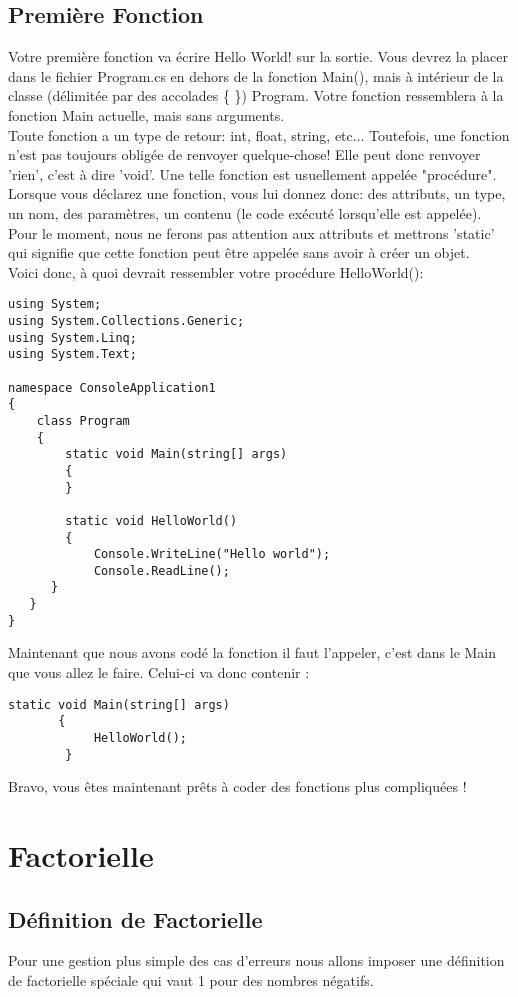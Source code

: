\documentclass[12pt,a4paper]{report}
\begin{document}
\subsection {Première Fonction}
Votre première fonction va écrire Hello World! sur la sortie. Vous devrez
la placer dans le fichier Program.cs en dehors de la fonction Main(), mais à intérieur de la classe (délimitée par des accolades \{ \}) Program.
Votre fonction ressemblera à la fonction Main actuelle, mais sans arguments.\\
Toute fonction a un type de retour: int, float, string, etc... Toutefois, une fonction n'est pas toujours obligée de renvoyer quelque-chose!
Elle peut donc renvoyer 'rien', c'est à dire 'void'. Une telle fonction est usuellement appelée "procédure".\\
Lorsque vous déclarez une fonction, vous lui donnez donc: des attributs, un type, un nom, des paramètres, un contenu (le code exécuté lorsqu'elle est appelée).
Pour le moment, nous ne ferons pas attention aux attributs et mettrons 'static' qui signifie que cette fonction peut être appelée sans avoir à créer un objet.\\
Voici donc, à quoi devrait ressembler votre procédure HelloWorld():
\begin{lstlisting}
using System;
using System.Collections.Generic;
using System.Linq;
using System.Text;  

namespace ConsoleApplication1
{
    class Program
    {
        static void Main(string[] args)
        {
        }

        static void HelloWorld()
        {
            Console.WriteLine("Hello world");
            Console.ReadLine();
      }
   }
}

\end{lstlisting}
Maintenant que nous avons codé la fonction il faut l'appeler, c'est dans
le Main que vous allez le faire. Celui-ci va donc contenir :
\begin{lstlisting}
static void Main(string[] args)
       {
            HelloWorld();
        }
\end{lstlisting}
Bravo, vous êtes maintenant prêts à coder des fonctions plus compliquées !

\section{Factorielle}
\subsection{Définition de Factorielle}
Pour une gestion plus simple des cas d’erreurs nous allons imposer une
définition de factorielle spéciale qui vaut 1 pour des nombres négatifs.\\
\end{document}
